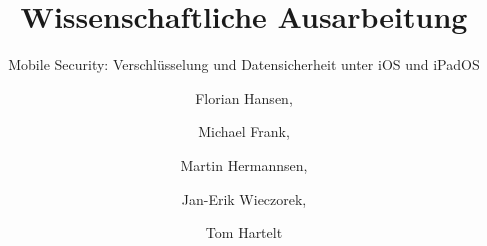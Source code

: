 \documentclass{hsflensburg}
\title{Wissenschaftliche Ausarbeitung}
\subtitle{Mobile Security: Verschlüsselung und Datensicherheit unter iOS und iPadOS}
\author{
	Florian Hansen,
	\and
	Michael Frank,
	\and
	Martin Hermannsen,
	\and
	Jan-Erik Wieczorek,
	\and
	Tom Hartelt
}
\begin{document}
	\maketitle
  
  \tableofcontents

  \pagebreak
	
	

  \pagebreak
  

  \pagebreak
  

	\pagebreak
	

	\clearpage
	
	
\end{document}

